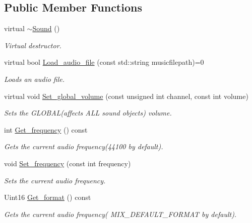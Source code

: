 \subsection*{Public Member Functions}
\begin{DoxyCompactItemize}
\item 
virtual \hyperlink{classjetfuel_1_1media_1_1Sound_a9b588c3a8749ce496f19cf499e5d98bb}{$\sim$\+Sound} ()
\begin{DoxyCompactList}\small\item\em Virtual destructor. \end{DoxyCompactList}\item 
virtual bool \hyperlink{classjetfuel_1_1media_1_1Sound_ab18ff9b8dd2001fa11b17649a6a3defb}{Load\+\_\+audio\+\_\+file} (const std\+::string musicfilepath)=0
\begin{DoxyCompactList}\small\item\em Loads an audio file. \end{DoxyCompactList}\item 
virtual void \hyperlink{classjetfuel_1_1media_1_1Sound_a4dec23a59c74ddbdf10386205e68cb29}{Set\+\_\+global\+\_\+volume} (const unsigned int channel, const int volume)
\begin{DoxyCompactList}\small\item\em Sets the G\+L\+O\+B\+A\+L(affects A\+L\+L sound objects) volume. \end{DoxyCompactList}\item 
int \hyperlink{classjetfuel_1_1media_1_1Sound_adf11e3f1005cbad8ffe746e83978200d}{Get\+\_\+frequency} () const
\begin{DoxyCompactList}\small\item\em Gets the current audio frequency(44100 by default). \end{DoxyCompactList}\item 
void \hyperlink{classjetfuel_1_1media_1_1Sound_af67e7d4f9d1509b1a8dcea3e3a7860c8}{Set\+\_\+frequency} (const int frequency)
\begin{DoxyCompactList}\small\item\em Sets the current audio frequency. \end{DoxyCompactList}\item 
Uint16 \hyperlink{classjetfuel_1_1media_1_1Sound_a91d355730fe004228942d38b2e2264b9}{Get\+\_\+format} () const
\begin{DoxyCompactList}\small\item\em Gets the current audio frequency( M\+I\+X\+\_\+\+D\+E\+F\+A\+U\+L\+T\+\_\+\+F\+O\+R\+M\+AT by default). \end{DoxyCompactList}\item 

\end{DoxyCompactItemize}
